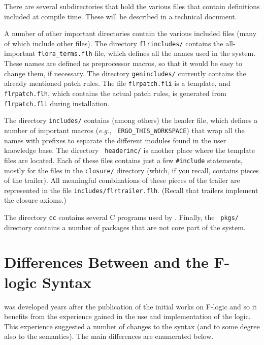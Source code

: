 \documentclass[11pt]{article}
\newcommand{\ERGO}{\mbox{\smaller{\ensuremath{\cal{E}}\smaller{{\sc{RGO}}}}}\xspace}
\newcommand{\FLSYSTEM}{\ERGO}
\begin{document}
There are several subdirectories that hold the various files that contain
definitions included at compile time. These will be described in a
technical document.

A number of other important directories contain the various included files
(many of which include other files). The directory {\tt flrincludes/}
contains the all-important {\tt flora\_terms.flh} file, which defines all
the names used in the system. These names are defined as preprocessor
macros, so that it would be easy to change them, if necessary.
The directory {\tt genincludes/} currently contains the already mentioned
patch rules. The file {\tt flrpatch.fli} is a template, and {\tt
  flrpatch.flh}, which contains the actual patch rules, is generated from
{\tt flrpatch.fli} during installation.

The directory {\tt includes/} contains (among others) the header file,
which defines a number of important macros ({\it e.g.}, {\tt
  ERGO\_THIS\_WORKSPACE}) that wrap all the names with prefixes to
separate the different modules found in the user knowledge base.  The directory {\tt
  headerinc/} is another place where the template files are located. Each
of these files contains just a few {\tt \#include} statements, mostly for
the files in the {\tt closure/} directory (which, if you recall, contains
pieces of the trailer). All meaningful combinations of these pieces of the
trailer are represented in the file {\tt includes/flrtrailer.flh}.  (Recall
that trailers implement the closure axioms.)

The directory {\tt cc} contains several C programs used by \FLSYSTEM.
Finally, the {\tt
  pkgs/} directory contains a number of \FLSYSTEM packages that are not
core part of the system.

\newpage
\section{Differences Between \FLSYSTEM and the F-logic Syntax}

\FLSYSTEM was developed years after the publication of the initial
works on F-logic \cite{KLW95} and so it benefits from the experience gained
in the use and implementation of the logic. This experience suggested a
number of changes to the syntax (and to some degree also to the
semantics). The main differences are enumerated below.
\end{document}
